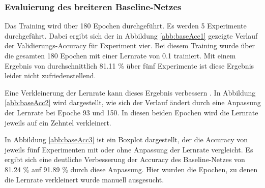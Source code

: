 \subsubsection{Evaluierung des breiteren Baseline-Netzes}
Das Training wird über 180 Epochen durchgeführt. Es werden 5 Experimente durchgeführt. Dabei ergibt sich der in Abbildung \ref{abb:baseAcc1} gezeigte Verlauf der Validierungs-Accuracy für Experiment vier. Bei diesem Training wurde über die gesamten 180 Epochen mit einer Lernrate von 0.1 trainiert. Mit einem Ergebnis von durchschnittlich 81.11 \% über fünf Experimente ist diese Ergebnis leider nicht zufriedenstellend. 

Eine Verkleinerung der Lernrate kann dieses Ergebnis verbessern \cite{CNNBook}. In Abbildung \ref{abb:baseAcc2} wird dargestellt, wie sich der Verlauf ändert durch eine Anpassung der Lernrate bei Epoche 93 und 150. In diesen beiden Epochen wird die Lernrate jeweils auf ein Zehntel verkleinert. 

In Abbildung \ref{abb:baseAcc3} ist ein Boxplot dargestellt, der die Accuracy von jeweils fünf Experimenten mit oder ohne Anpassung der Lernrate vergleicht. Es ergibt sich eine deutliche Verbesserung der Accuracy des Baseline-Netzes von 81.24 \% auf 91.89 \% durch diese Anpassung. Hier wurden die Epochen, zu denen die Lernrate verkleinert wurde manuell ausgesucht. 

